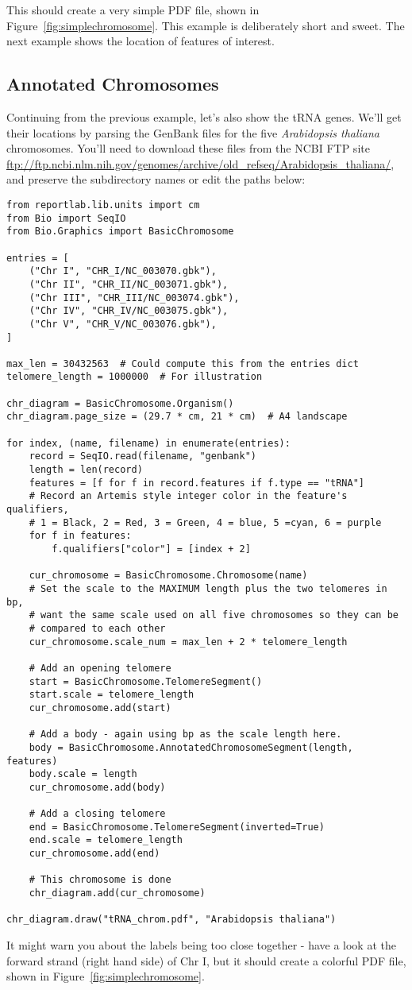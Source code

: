 This should create a very simple PDF file, shown
in Figure~\ref{fig:simplechromosome}.
This example is deliberately short and sweet. The next example shows the
location of features of interest.

\subsection{Annotated Chromosomes}

Continuing from the previous example, let's also show the tRNA genes.
We'll get their locations by parsing the GenBank files for the five
\textit{Arabidopsis thaliana} chromosomes. You'll need to download these
files from the NCBI FTP site
\url{ftp://ftp.ncbi.nlm.nih.gov/genomes/archive/old_refseq/Arabidopsis_thaliana/},
and preserve the subdirectory names or edit the paths below:

\begin{verbatim}
from reportlab.lib.units import cm
from Bio import SeqIO
from Bio.Graphics import BasicChromosome

entries = [
    ("Chr I", "CHR_I/NC_003070.gbk"),
    ("Chr II", "CHR_II/NC_003071.gbk"),
    ("Chr III", "CHR_III/NC_003074.gbk"),
    ("Chr IV", "CHR_IV/NC_003075.gbk"),
    ("Chr V", "CHR_V/NC_003076.gbk"),
]

max_len = 30432563  # Could compute this from the entries dict
telomere_length = 1000000  # For illustration

chr_diagram = BasicChromosome.Organism()
chr_diagram.page_size = (29.7 * cm, 21 * cm)  # A4 landscape

for index, (name, filename) in enumerate(entries):
    record = SeqIO.read(filename, "genbank")
    length = len(record)
    features = [f for f in record.features if f.type == "tRNA"]
    # Record an Artemis style integer color in the feature's qualifiers,
    # 1 = Black, 2 = Red, 3 = Green, 4 = blue, 5 =cyan, 6 = purple
    for f in features:
        f.qualifiers["color"] = [index + 2]

    cur_chromosome = BasicChromosome.Chromosome(name)
    # Set the scale to the MAXIMUM length plus the two telomeres in bp,
    # want the same scale used on all five chromosomes so they can be
    # compared to each other
    cur_chromosome.scale_num = max_len + 2 * telomere_length

    # Add an opening telomere
    start = BasicChromosome.TelomereSegment()
    start.scale = telomere_length
    cur_chromosome.add(start)

    # Add a body - again using bp as the scale length here.
    body = BasicChromosome.AnnotatedChromosomeSegment(length, features)
    body.scale = length
    cur_chromosome.add(body)

    # Add a closing telomere
    end = BasicChromosome.TelomereSegment(inverted=True)
    end.scale = telomere_length
    cur_chromosome.add(end)

    # This chromosome is done
    chr_diagram.add(cur_chromosome)

chr_diagram.draw("tRNA_chrom.pdf", "Arabidopsis thaliana")
\end{verbatim}

It might warn you about the labels being too close together - have a look
at the forward strand (right hand side) of Chr I, but it should create a
colorful PDF file, shown
in Figure~\ref{fig:simplechromosome}.
